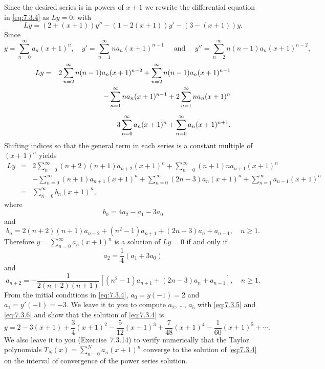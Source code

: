 \begin{examplesolution}
\solution Since the desired series is in powers of $x+1$ we rewrite the differential equation in
\eqref{eq:7.3.4} as $Ly=0$, with
\[
  Ly=\left(2+(x+1)\right)y''-\left(1-2(x+1)\right)y'-\left(3-(x+1)\right)y.
\]
Since
\[
  y=\sum^{\infty}_{n=0}a_{n}(x+1)^{n},\quad y'=\sum^{\infty}_{n=1}n a_{n}(x+1)^{n-1}\quad\mbox{ and }\quad y''=\sum^{\infty}_{n=2}n(n-1)a_{n}(x+1)^{n-2},
\]
\begin{eqnarray*}
  Ly & = & 2\sum^{\infty}_{n=2}n(n-1)a_{n}(x+1)^{n-2}+\sum^{\infty}_{n=2}n(n-1)a_{n}(x+1)^{n-1} \\
     &   & -\sum^{\infty}_{n=1}na_{n}(x+1)^{n-1}+2\sum^{\infty}_{n=1}na_{n}(x+1)^{n}            \\[2\jot]
     &   & -3\sum^{\infty}_{n=0}a_{n}(x+1)^{n}+\sum_{n=0}^{\infty}a_{n}(x+1)^{n+1}.
\end{eqnarray*}
Shifting indices so that the general term in each series is a constant multiple of $(x+1)^{n}$
yields
\begin{eqnarray*}
  Ly & = & 2\sum^{\infty}_{n=0}(n+2)(n+1)a_{n+2}(x+1)^{n}+\sum^{\infty}_{n=0}(n+1)na_{n+1}(x+1)^{n}                              \\[10pt]
     &   & -\sum^{\infty}_{n=0}(n+1)a_{n+1}(x+1)^{n}+\sum^{\infty}_{n=0}(2n-3)a_{n}(x+1)^{n}+\sum^{\infty}_{n=1}a_{n-1}(x+1)^{n} \\[10pt]
     & = & \sum^{\infty}_{n=0}b_{n}(x+1)^{n},
\end{eqnarray*}
where
\[
  b_{0}=4a_{2}-a_{1}-3a_{0}
\]
and
\[
  b_{n}=2(n+2)(n+1)a_{n+2}+(n^{2}-1)a_{n+1}+(2n-3)a_{n}+a_{n-1},\quad n\ge1.
\]
Therefore $y=\sum^{\infty}_{n=0}a_{n}(x+1)^{n}$ is a solution of $Ly=0$ if and only if
\begin{equation}
  \label{eq:7.3.5}a_{2}=\frac{1}{4}(a_{1}+3a_{0})
\end{equation}
and
\begin{equation}
  \label{eq:7.3.6}a_{n+2}=-\frac{1}{2(n+2)(n+1)}\left[(n^{2}-1)a_{n+1}+(2n-3)a_{n}+a_{n-1}\right], \quad n\ge1.
\end{equation}
From the initial conditions in \eqref{eq:7.3.4}, $a_{0}=y(-1)=2$ and $a_{1}=y'(-1)=-3$. We leave it
to you to compute $a_{2}$, \dots, $a_{5}$ with \eqref{eq:7.3.5} and \eqref{eq:7.3.6} and show that
the solution of \eqref{eq:7.3.4} is
\[
  y=2-3(x+1)+\frac{3}{4}(x+1)^{2}-\frac{5}{12}(x+1)^{3}+\frac{7}{48}(x+1)^{4}-\frac{1}{60}(x+1)^{5}+\cdots.
\]
We also leave it to you (Exercise~7.3.14) to verify numerically that the Taylor
polynomials $T_{N}(x)=\sum_{n=0}^{N}a_{n}(x+1)^{n}$ converge to the solution of \eqref{eq:7.3.4} on the
interval of convergence of the power series solution.
\end{examplesolution}

